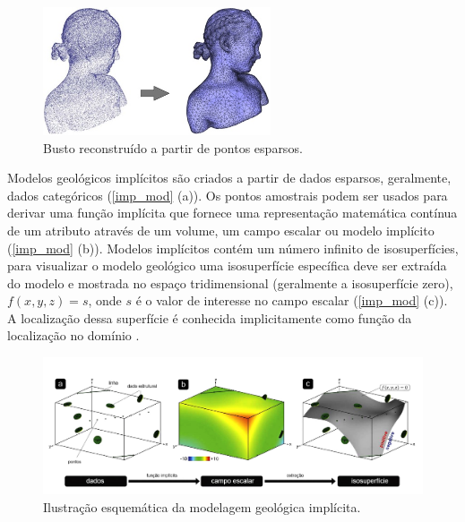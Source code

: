 \begin{figure}[H]
	\caption{\label{busto}Busto reconstruído a partir de pontos esparsos.} 
	\begin{center}
		\includegraphics[width=0.6\textwidth]{capitulo_1/busto}
	\end{center}
\end{figure}

Modelos geológicos implícitos são criados a partir de dados esparsos, geralmente, dados categóricos (\autoref{imp_mod} (a)). Os pontos amostrais podem ser usados para derivar uma função implícita que fornece uma representação matemática contínua de um atributo através de um volume, um campo escalar ou modelo implícito (\autoref{imp_mod} (b)). Modelos implícitos contém um número infinito de isosuperfícies, para visualizar o modelo geológico uma isosuperfície específica deve ser extraída do modelo e mostrada no espaço tridimensional (geralmente a isosuperfície zero), $f(x,y,z)=s$, onde $s$ é o valor de interesse no campo escalar (\autoref{imp_mod} (c)). A localização dessa superfície é conhecida implicitamente como função da localização no domínio \cite{martin2017implicitmodeling}. 

\begin{figure}[H]
	\caption{\label{imp_mod}Ilustração esquemática da modelagem geológica implícita.}
	\begin{center}
		\includegraphics[width=\textwidth]{capitulo_1/implicit_modelig_pt_1}
	\end{center}
\end{figure}

